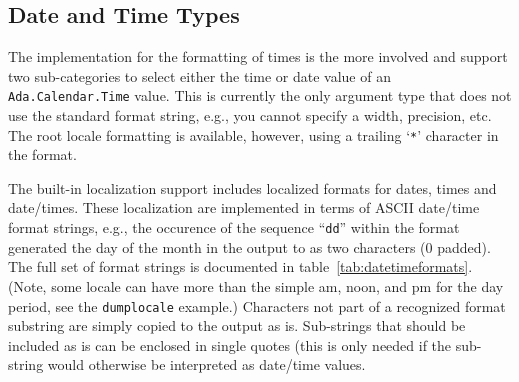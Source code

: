 \subsection{Date and Time Types}
\label{sec:datetime}

The implementation for the formatting of times is the more involved
and support two sub-categories to select either the time or date value
of an \verb|Ada.Calendar.Time| value.  This is currently the only argument
type that does not use the standard format string, e.g., you cannot specify
a width, precision, etc.  The root locale formatting is available, however,
using a trailing `\texttt{*}' character in the format.

The built-in localization support includes localized formats for dates,
times and date/times.  These localization are implemented in terms of
ASCII date/time format strings, e.g., the occurence of the sequence
``\texttt{dd}'' within the format generated the day of the month in the
output to as two characters (0 padded).  The full set of format strings
is documented in table~\ref{tab:datetimeformats}.  (Note, some locale
can have more than the simple am, noon, and pm for the day period, see
the \texttt{dumplocale} example.)  Characters not part
of a recognized format substring are simply copied to the output as is.
Sub-strings that should be included as is can be enclosed in single quotes
(this is only needed if the sub-string would otherwise be interpreted as
date/time values.
